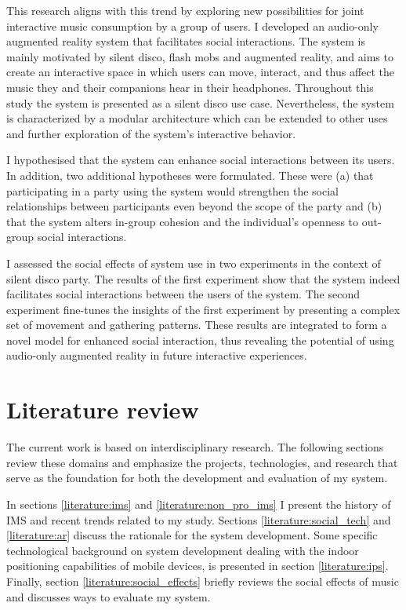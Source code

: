 \documentclass[a4paper,11pt]{article}
\begin{document}
This research aligns with this trend by exploring new possibilities for joint interactive music consumption by a group of users.
I developed an audio-only augmented reality system that facilitates social interactions.
The system is mainly motivated by silent disco, flash mobs and augmented reality, and aims to create an interactive space in which users can move, interact, and thus affect the music they and their companions hear in their headphones.
Throughout this study the system is presented as a silent disco use case.
Nevertheless, the system is characterized by a modular architecture which can be extended to other uses and further exploration of the system's interactive behavior.

I hypothesised that the system can enhance social interactions between its users.
In addition, two additional hypotheses were formulated.
These were (a) that participating in a party using the system would strengthen the social relationships between participants even beyond the scope of the party and (b) that the system alters in-group cohesion and the individual's openness to out-group social interactions.

I assessed the social effects of system use in two experiments in the context of silent disco party.
The results of the first experiment show that the system indeed facilitates social interactions between the users of the system.
The second experiment fine-tunes the insights of the first experiment by presenting a complex set of movement and gathering patterns.
These results are integrated to form a novel model for enhanced social interaction, thus revealing the potential of using audio-only augmented reality in future interactive experiences.

\clearpage\section{Literature review}

The current work is based on interdisciplinary research.
The following sections review these domains and emphasize the projects, technologies, and research that serve as the foundation for both the development and evaluation of my system.

In sections \ref{literature:ims} and \ref{literature:non_pro_ims} I present the history of IMS and recent trends related to my study.
Sections \ref{literature:social_tech} and \ref{literature:ar} discuss the rationale for the system development.
Some specific technological background on system development dealing with the indoor positioning capabilities of mobile devices, is presented in section \ref{literature:ips}.
Finally, section \ref{literature:social_effects} briefly reviews the social effects of music and discusses ways to evaluate my system.
\end{document}

